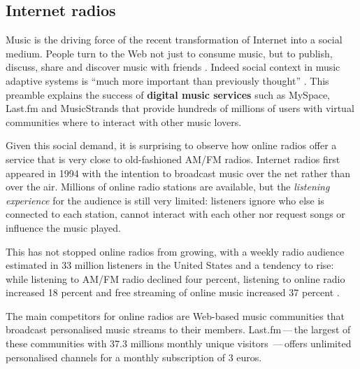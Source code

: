 


\subsection{Internet radios} %
\label{sub:problems_of_web_radios}

Music is the driving force of the recent transformation of Internet into a social medium. People turn to the Web not just to consume music, but to publish, discuss, share and discover music with friends \cite{McGuire05}.
Indeed social context in music adaptive systems is ``much more important than previously thought'' \cite{McEnnis07}. This preamble explains the success of \textbf{digital music services} such as MySpace, Last.fm and MusicStrands that provide hundreds of millions of users with virtual communities where to interact with other music lovers. %

Given this social demand, it is surprising to observe how online radios offer a service that is very close to old-fashioned AM/FM radios. 
Internet radios first appeared in 1994 \cite{WXYC04} with the intention to broadcast music over the net rather than over the air. 
Millions of online radio stations are available, but the \emph{listening experience} for the audience is still very limited: listeners ignore who else is connected to each station, cannot interact with each other nor request songs or influence the music played.

This has not stopped online radios from growing, with a weekly radio audience estimated in 33 million listeners in the United States \cite{Arbitron08} and a tendency to rise: while listening to AM/FM radio declined four percent, listening to online radio increased 18 percent and free streaming of online music increased 37 percent \cite{NPD05}.

The main competitors for online radios are Web-based music communities that broadcast personalised music streams to their members. 
Last.fm\,---\,the largest of these communities with 37.3 millions monthly unique visitors \cite{Lastfm09}\,---\,offers unlimited personalised channels for a monthly subscription of 3 euros. 

